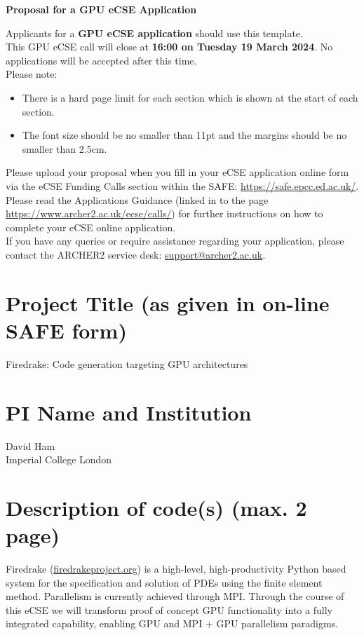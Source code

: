 \documentclass[a4paper,11pt]{article}
\title{}
\author{}
\date{\today}
\begin{document}
\begin{center}
\huge \textbf{Proposal for a GPU eCSE Application}\\
\end{center}
Applicants for a \textbf{GPU eCSE application} should use this template.\\

\noindent This GPU eCSE call will close at \textbf{16:00 on Tuesday 19 March 2024}. No applications will be accepted after this time.\\

\noindent Please note:
\begin{itemize}[nosep]
	\item There is a hard page limit for each section which is shown at the start of each section. 
	\item The font size should be no smaller than 11pt and the margins should be no smaller than 2.5cm. 
\end{itemize}\vspace{1em}

\noindent Please upload your proposal when you fill in your eCSE application online form via the eCSE Funding Calls section within the SAFE: \url{https://safe.epcc.ed.ac.uk/}.\\

\noindent Please read the Applications Guidance (linked in to the page \url{https://www.archer2.ac.uk/ecse/calls/}) for further instructions on how to complete your eCSE online application.\\

\noindent If you have any queries or require assistance regarding your application, please contact the ARCHER2 service desk: \url{support@archer2.ac.uk}.

\section{Project Title (as given in on-line SAFE form)}
Firedrake: Code generation targeting GPU architectures

\section{PI Name and Institution}
David Ham\\
Imperial College London

\clearpage
\section{Description of code(s) (max. 2 page)}
Firedrake (\url{firedrakeproject.org}) is a high-level, high-productivity Python based system for the specification and solution of PDEs using the finite element method.
Parallelism is currently achieved through MPI.
Through the course of this eCSE we will transform proof of concept GPU functionality into a fully integrated capability, enabling GPU and MPI + GPU parallelism paradigms. 
\end{document}
